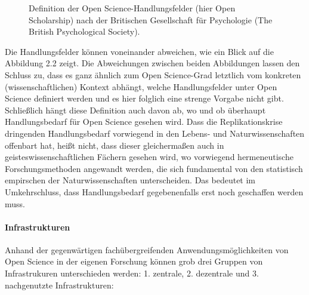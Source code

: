 \begin{figure}[h]
    \centering
    \caption{Definition der Open Science-Handlungsfelder (hier Open Scholarship) nach der Britischen Gesellschaft für Psychologie (The British Psychological Society).\protect\footnotemark}
    \label{fig:x cubed graph}
\end{figure} 

Die Handlungsfelder können voneinander abweichen, wie ein Blick auf die Abbildung 2.2 zeigt. Die Abweichungen zwischen beiden Abbildungen lassen den Schluss zu, dass es ganz ähnlich zum Open Science-Grad letztlich vom konkreten (wissenschaftlichen) Kontext abhängt, welche Handlungsfelder unter Open Science definiert werden und es hier folglich eine strenge Vorgabe nicht gibt. Schließlich hängt diese Definition auch davon ab, wo und ob überhaupt Handlungsbedarf für Open Science gesehen wird. Dass die Replikationskrise dringenden Handlungsbedarf vorwiegend in den Lebens- und Naturwissenschaften offenbart hat, heißt nicht, dass dieser gleichermaßen auch in geisteswissenschaftlichen Fächern gesehen wird, wo vorwiegend hermeneutische Forschungsmethoden angewandt werden, die sich fundamental von den statistisch empirschen der Naturwissenschaften unterscheiden. Das bedeutet im Umkehrschluss, dass Handlungsbedarf gegebenenfalls erst noch geschaffen werden muss. 

\paragraph{Infrastrukturen} Anhand der gegenwärtigen fachübergreifenden Anwendungsmöglichkeiten von Open Science in der eigenen Forschung können grob drei Gruppen von Infrastrukuren unterschieden werden: 1. zentrale, 2. dezentrale und 3. nachgenutzte Infrastrukturen:

